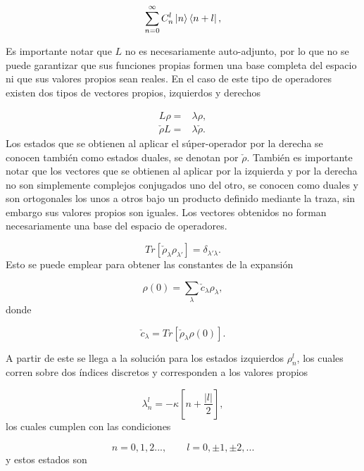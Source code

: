 \documentclass[10pt,a4paper]{report}
\begin{document}
\begin{equation}
\sum_{n=0}^\infty C_n^l\Ket{n}\Bra{n+l},
\end{equation}

Es importante notar que $L$ no es necesariamente auto-adjunto, por lo que no se puede garantizar que sus funciones propias formen una base completa del espacio ni que sus valores propios sean reales. En el caso de este tipo de operadores existen dos tipos de vectores propios\cite{BarnettSD}, izquierdos y derechos

\begin{align*}
L\rho =& \lambda \rho, \\
\check{\rho} L =& \lambda \check{\rho}.
\end{align*} Los estados que se obtienen al aplicar el súper-operador por la derecha se conocen también como estados duales, se denotan por $\check{\rho}$. También es importante notar que los vectores que se obtienen al aplicar por la izquierda y por la derecha no son simplemente complejos conjugados uno del otro, se conocen como duales y son ortogonales los unos a otros bajo un producto definido mediante la traza\cite{EnglertDB}, sin embargo sus valores propios son iguales. Los vectores obtenidos no forman necesariamente una base del espacio de operadores. 

\begin{equation}
Tr[\check{\rho}_\lambda \rho_{\lambda'}] = \delta_{\lambda'\lambda}.
\end{equation} Esto se puede emplear para obtener las constantes de la expansión

\begin{equation}
\rho(0) = \sum_{\lambda} \check{c}_{\lambda} \rho_{\lambda},
\end{equation} donde

\begin{equation}
\check{c}_\lambda = Tr[\check{\rho}_\lambda \rho(0)].
\end{equation}

A partir de este se llega a la solución para los estados izquierdos $\rho_n^l$, los cuales corren sobre dos índices discretos y corresponden a los valores propios
\cite{EnglertDB}

\begin{equation}
\lambda_n^l = -\kappa[n + \frac{|l|}{2}],
\end{equation} los cuales cumplen con las condiciones

\begin{equation}
n=0,1,2...,\qquad l = 0,\pm 1, \pm 2,... 
\end{equation} y estos estados son
\end{document}
